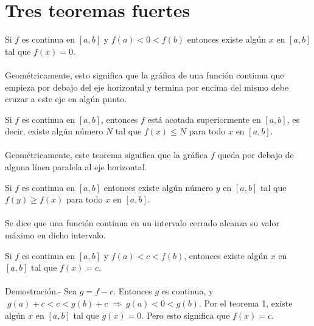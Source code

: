 
\chapter{Tres teoremas fuertes}


\begin{tcolorbox}
    \begin{teo}
	Si $f$ es continua en $[a,b]$ y $f(a)<0<f(b)$ entonces existe algún $x$ en $[a,b]$ tal que $f(x)=0$.\\\\
	Geométricamente, esto significa que la gráfica de una función continua que empieza por debajo del eje horizontal y termina por encima del mismo debe cruzar a este eje en algún punto.
    \end{teo}
\end{tcolorbox}

\begin{tcolorbox}
    \begin{teo}
	Si $f$ es continua en $[a,b]$, entonces $f$ está acotada superiormente en $[a,b]$, es decir, existe algún número $N$ tal que $f(x)\leq N$ para todo $x$ en $[a,b]$.\\\\
	Geométricamente, este teorema significa que la gráfica $f$ queda por debajo de alguna línea paralela al eje horizontal. 
    \end{teo}
\end{tcolorbox}

\begin{tcolorbox}
    \begin{teo}
	Si $f$ es continua en $[a,b]$ entonces existe algún número $y$ en $[a,b]$ tal que $f(y)\geq f(x)$ para todo $x$ en $[a,b]$.\\\\
	Se dice que una función continua en un intervalo cerrado alcanza su valor máximo en dicho intervalo.
    \end{teo}
\end{tcolorbox}

\begin{teo}
    Si $f$ es continua en $[a,b]$ y $f(a)<c<f(b)$, entonces existe algún $x$ en $[a,b]$ tal que $f(x)=c$.\\\\
    Demostración.-\; Sea $g=f-c$. Entonces $g$ es continua, y $\; g(a)+c < c < g(b) + c \; \Longrightarrow \; g(a)<0<g(b)$. Por el teorema 1, existe algún $x$ en $[a,b]$ tal que $g(x)=0$. Pero esto significa que $f(x)=c.$\\\\
\end{teo}

